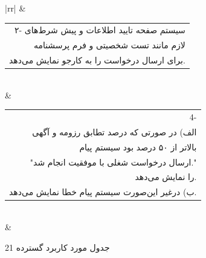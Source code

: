\documentclass[12pt]{article}
\begin{document}
\begin{center}
\begin{table}[H]
\begin{tabular}{|rr|}
				                                           & \begin{tabular}[c]{@{}r@{}}۲- سیستم صفحه تایید اطلاعات و پیش شرط‌های\\  لازم مانند تست شخصیتی و فرم پرسشنامه\\  برای ارسال درخواست را به کارجو نمایش می‌دهد.\end{tabular}                                                                     \\ \hline
				 & \begin{tabular}[c]{@{}r@{}}4- \\ الف) در صورتی که درصد تطابق رزومه و آگهی\\  بالاتر از ۵۰ درصد بود سیستم پیام \\ "ارسال درخواست شغلی با موفقیت انجام شد." \\  را نمایش می‌دهد.\\ ب) درغیر این‌صورت سیستم پیام خطا نمایش می‌دهد.\end{tabular} \\ \hline
				                            &                                                                                                                                                                                                                          \\ \hline

			\end{tabular}
		\end{table}

		\begin{table}[ht]
			\caption{جدول مورد کاربرد گسترده 21}
			\label{tab:ext-uc21}
			\centering


\end{table}
\end{center}
\end{document}

